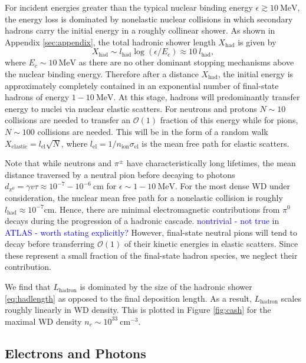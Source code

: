 \documentclass[twocolumn,showpacs,preprintnumbers,amsmath,amssymb,prd]{revtex4}
\newcommand{\OO}{\mathcal{O}}
\begin{document}
For incident energies greater than the typical nuclear binding energy $\epsilon \gtrsim 10 ~\text{MeV}$, the energy loss is dominated by nonelastic nuclear collisions in which secondary hadrons carry the initial energy in a roughly collinear shower. As shown in Appendix \ref{sec:appendix}, the total hadronic shower length $X_{\text{had}}$ is given by
\begin{equation}
X_{\text{had}} \sim l_\text{had} \log{(\epsilon/E_c)} \approx 10 ~l_\text{had},
\label{eq:hadlength}
\end{equation}
where $E_c \sim 10 ~\text{MeV}$ as there are no other dominant stopping mechanisms above the nuclear binding energy. Therefore after a distance $X_\text{had}$, the initial energy is approximately completely contained in an exponential number of final-state hadrons of energy $1 - 10 ~\text{MeV}$. At this stage, hadrons will predominantly transfer energy to nuclei via nuclear elastic scatters. For neutrons and protons $N \sim 10$ collisions are needed to transfer an $\OO(1)$ fraction of this energy while for pions, $N \sim 100$ collisions are needed. This will be in the form of a random walk $X_\text{elastic} = l_\text{el} \sqrt{N}$, where $ l_\text{el} = 1/n_\text{ion} \sigma_\text{el}$ is the mean free path for elastic scatters.

Note that while neutrons and $\pi^\pm$ have characteristically long lifetimes, the mean distance traversed by a neutral pion before decaying to photons $d_{\pi^0} = \gamma v \tau \approx 10^{-7} - 10^{-6} ~\text{cm}$ for $\epsilon \sim 1 - 10 ~\text{MeV}$. For the most dense WD under consideration, the nuclear mean free path for a nonelastic collision is roughly $l_\text{had} \approx 10^{-7} \text{cm}$. Hence, there are minimal electromagnetic contributions from $\pi^0$ decays during the progression of a hadronic cascade. \textcolor{blue}{nontrivial - not true in ATLAS - worth stating explicitly?} However, final-state neutral pions will tend to decay before transferring $\OO(1)$ of their kinetic energies in elastic scatters. Since these represent a small fraction of the final-state hadron species, we neglect their contribution.

We find that $L_\text{hadron}$ is dominated by the size of the hadronic shower \eqref{eq:hadlength} as opposed to the final deposition length. As a result, $L_\text{hadron}$ scales roughly linearly in WD density. This is plotted in Figure \ref{fig:cash} for the maximal WD density $n_e \sim 10^{33} ~\text{cm}^{-3}$. 

\subsection{Electrons and Photons}
\end{document}
